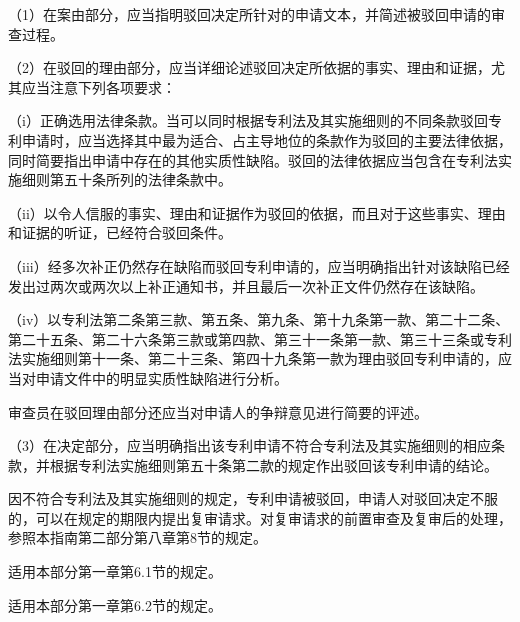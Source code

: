 {\setlength{\parindent}{17.1bp}（1）在案由部分，应当指明驳回决定所针对的申请文本，并简述被驳回申请的审查过程。\par}

{\setlength{\parindent}{17.1bp}（2）在驳回的理由部分，应当详细论述驳回决定所依据的事实、理由和证据，尤其应当注意下列各项要求：\par}

{\setlength{\parindent}{17.1bp}（i）正确选用法律条款。当可以同时根据专利法及其实施细则的不同条款驳回专利申请时，应当选择其中最为适合、占主导地位的条款作为驳回的主要法律依据，同时简要指出申请中存在的其他实质性缺陷。驳回的法律依据应当包含在专利法实施细则第五十条所列的法律条款中。\par}

{\setlength{\parindent}{17.1bp}（ii）以令人信服的事实、理由和证据作为驳回的依据，而且对于这些事实、理由和证据的听证，已经符合驳回条件。\par}

{\setlength{\parindent}{17.1bp}（iii）经多次补正仍然存在缺陷而驳回专利申请的，应当明确指出针对该缺陷已经发出过两次或两次以上补正通知书，并且最后一次补正文件仍然存在该缺陷。\par}

{\setlength{\parindent}{17.1bp}（iv）以专利法第二条第三款、第五条、第九条、第十九条第一款、第二十二条、第二十五条、第二十六条第三款或第四款、第三十一条第一款、第三十三条或专利法实施细则第十一条、第二十三条、第四十九条第一款为理由驳回专利申请的，应当对申请文件中的明显实质性缺陷进行分析。\par}

审查员在驳回理由部分还应当对申请人的争辩意见进行简要的评述。

{\setlength{\parindent}{17.1bp}（3）在决定部分，应当明确指出该专利申请不符合专利法及其实施细则的相应条款，并根据专利法实施细则第五十条第二款的规定作出驳回该专利申请的结论。\par}

因不符合专利法及其实施细则的规定，专利申请被驳回，申请人对驳回决定不服的，可以在规定的期限内提出复审请求。对复审请求的前置审查及复审后的处理，参照本指南第二部分第八章第8节的规定。

适用本部分第一章第6.1节的规定。

适用本部分第一章第6.2节的规定。


